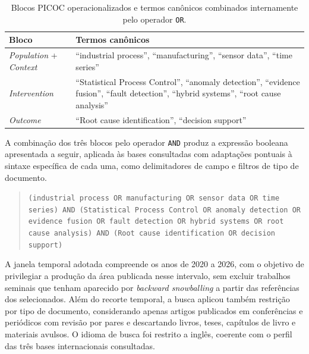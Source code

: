 \begin{table}[htbp]
    \centering
    \footnotesize
    \caption{Blocos PICOC operacionalizados e termos canônicos combinados internamente pelo operador \texttt{OR}.}
    \label{tab:blocos_picoc}
    \begin{tabularx}{\textwidth}{lX}
        \toprule
        \textbf{Bloco} & \textbf{Termos canônicos} \\
        \midrule
        \emph{Population} + \emph{Context} & ``industrial process'', ``manufacturing'', ``sensor data'', ``time series'' \\
        \emph{Intervention}                & ``Statistical Process Control'', ``anomaly detection'', ``evidence fusion'', ``fault detection'', ``hybrid systems'', ``root cause analysis'' \\
        \emph{Outcome}                     & ``Root cause identification'', ``decision support'' \\
        \bottomrule
    \end{tabularx}
\end{table}

A combinação dos três blocos pelo operador \texttt{AND} produz a expressão booleana apresentada a seguir, aplicada às bases consultadas com adaptações pontuais à sintaxe específica de cada uma, como delimitadores de campo e filtros de tipo de documento.

\begin{quote}
\texttt{(\textquotedbl industrial process\textquotedbl{} OR \textquotedbl manufacturing\textquotedbl{} OR \textquotedbl sensor data\textquotedbl{} OR \textquotedbl time series\textquotedbl) AND (\textquotedbl Statistical Process Control\textquotedbl{} OR \textquotedbl anomaly detection\textquotedbl{} OR \textquotedbl evidence fusion\textquotedbl{} OR \textquotedbl fault detection\textquotedbl{} OR \textquotedbl hybrid systems\textquotedbl{} OR \textquotedbl root cause analysis\textquotedbl) AND (\textquotedbl Root cause identification\textquotedbl{} OR \textquotedbl decision support\textquotedbl)}
\end{quote}

A janela temporal adotada compreende os anos de 2020 a 2026, com o objetivo de privilegiar a produção da área publicada nesse intervalo, sem excluir trabalhos seminais que tenham aparecido por \emph{backward snowballing} a partir das referências dos selecionados. Além do recorte temporal, a busca aplicou também restrição por tipo de documento, considerando apenas artigos publicados em conferências e periódicos com revisão por pares e descartando livros, teses, capítulos de livro e materiais avulsos. O idioma de busca foi restrito a inglês, coerente com o perfil das três bases internacionais consultadas.

